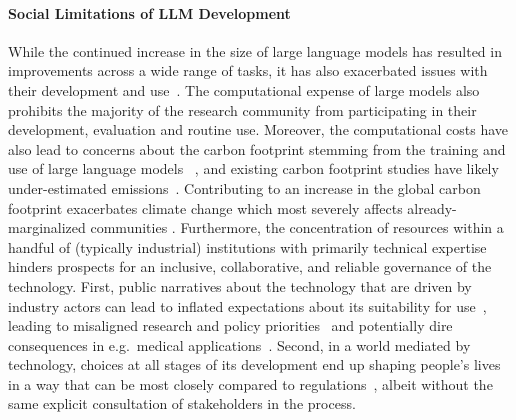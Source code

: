 \documentclass[twoside,11pt]{article}
\begin{document}
\paragraph{Social Limitations of LLM Development}
While the continued increase in the size of large language models 
has resulted in improvements
across a wide range of tasks,
it has also %
exacerbated issues with their development and use~\citep{bender2021dangers}. The computational expense of large models also prohibits the majority of the research community from participating in their development, evaluation and routine use.
Moreover, the computational costs have also lead to concerns about the carbon footprint stemming from the training and use of large language models
~\citep{strubell2019energy,lacoste2019quantifying,schwartz2020green,bannour-etal-2021-evaluating}, and existing carbon footprint studies have likely under-estimated emissions~\citep{bannour-etal-2021-evaluating}. 
Contributing to an increase in the global carbon footprint exacerbates climate change which most severely affects already-marginalized communities \citep{westra2001faces}.
Furthermore, the concentration of resources within a handful of (typically industrial) institutions with primarily technical expertise hinders prospects for an inclusive, collaborative, and reliable governance of the technology. First, public narratives about the technology that are driven by industry actors can lead to inflated expectations about its suitability for use~\citep{brennen2018hype,brennen2022expect}, leading to misaligned research and policy priorities~\citep{raji2022fallacy} and potentially dire consequences in e.g.\ medical applications~\citep{wong2021sepsis}. Second, in a world mediated by technology, choices at all stages of its development end up shaping people's lives in a way that can be most closely compared to regulations~\citep{winner1977technology,winner2017artifacts}, albeit without the same explicit consultation of stakeholders in the process. 
\end{document}
